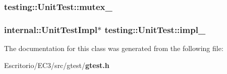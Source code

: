\subsubsection{ {\bf testing::UnitTest::mutex\_\-}\hspace{0.3cm}{\tt  [mutable, private]}}\label{classtesting_1_1UnitTest_700e6b4b815535175165bfca2f3a57b4}


\subsubsection{\setlength{\rightskip}{0pt plus 5cm}internal::UnitTestImpl$\ast$ {\bf testing::UnitTest::impl\_\-}\hspace{0.3cm}{\tt  [private]}}\label{classtesting_1_1UnitTest_bdbc21d9a1264600a85748daef2a0c5a}




The documentation for this class was generated from the following file:\begin{CompactItemize}
\item 
Escritorio/EC3/src/gtest/{\bf gtest.h}\end{CompactItemize}
